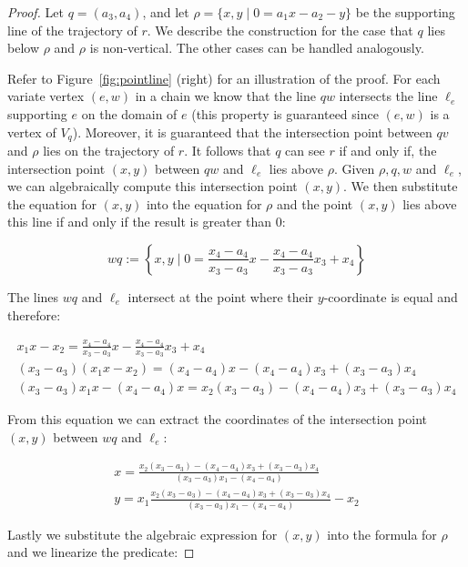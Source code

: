 \documentclass[UKenglish]{lipics-v2019}
\begin{document}
\begin{proof}
  Let $q = (a_3,a_4)$, and let $\rho = \{ x,y \mid 0 = a_1 x - a_2 - y \}$ be
  the supporting line of the trajectory of $r$. We describe the construction
  for the case that $q$ lies below $\rho$ and $\rho$ is non-vertical. The other
  cases can be handled analogously.
  
    Refer to Figure~\ref{fig:pointline} (right) for an illustration of the proof.   For each variate vertex $(e,w)$ in a chain we know that the line $qw$  intersects the line $\ell_e$ supporting $e$ on the domain of $e$ (this
  property is guaranteed since $(e,w)$ is a vertex of $V_q$). Moreover, it is
  guaranteed that the intersection point between $qv$ and $\rho$ lies on the
  trajectory of $r$. It follows that $q$ can see $r$ if and only if, the
  intersection point $(x,y)$ between $qw$ and $\ell_e$ lies above $\rho$. Given
  $\rho, q, w$ and $\ell_e$, we can algebraically compute this intersection
  point $(x,y)$. We then substitute the equation for $(x, y)$ into the equation
  for $\rho$ and the point $(x,y)$ lies above this line if and only if the
  result is greater than $0$:

\[
wq := \left\{x,y \mid 0 =  \frac{x_4 - a_4}{x_3 - a_3} x - \frac{x_4 - a_4}{x_3 - a_3}x_3 + x_4  \right\}
\]

The lines $wq$ and $\ell_e$ intersect at the point where their $y$-coordinate is equal and therefore:


\begin{align*}
    x_1 x - x_2 =  \frac{x_4 - a_4}{x_3 - a_3} x - \frac{x_4 - a_4}{x_3 - a_3}x_3 + x_4 \\
    (x_3 - a_3)(x_1 x - x_2) = (x_4 - a_4) x - (x_4 - a_4)x_3 + (x_3 - a_3) x_4 \\
    (x_3 - a_3)x_1 x - (x_4 - a_4) x = x_2 (x_3 - a_3) - (x_4 - a_4)x_3 + (x_3 - a_3) x_4 
\end{align*}


From this equation we can extract the coordinates of the intersection point $(x,y)$ between $wq$ and $\ell_e$:

\begin{align*}
    x = \frac{x_2 (x_3 - a_3) - (x_4 - a_4)x_3 + (x_3 - a_3) x_4}{ (x_3 - a_3)x_1 - (x_4 - a_4)} \\
    y = x_1 \frac{x_2 (x_3 - a_3) - (x_4 - a_4)x_3 + (x_3 - a_3) x_4}{ (x_3 - a_3)x_1 - (x_4 - a_4)} - x_2
\end{align*}

Lastly we substitute the algebraic expression for $(x,y)$ into the formula for $\rho$ and we linearize the predicate:


\end{proof}
\end{document}
